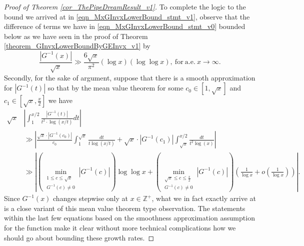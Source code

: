 \documentclass[11pt,reqno,a4letter]{article}
\numberwithin{figure}{section}
\numberwithin{table}{section}
\theoremstyle{plain}
\numberwithin{theorem}{section}
\theoremstyle{definition}
\begin{document}
\begin{proof}[Proof of Theorem \ref{cor_ThePipeDreamResult_v1}]
To complete the logic to the bound we arrived at in \eqref{eqn_MxGInvxLowerBound_stmt_v1}, 
observe that the difference of terms we have in 
\eqref{eqn_MxGInvxLowerBound_stmt_v0} bounded below as we have seen in the proof of 
Theorem \ref{theorem_GInvxLowerBoundByGEInvx_v1} by 
\[
\frac{|G^{-1}(x)|}{\sqrt{x}} \gg \frac{6\sqrt{x}}{\pi^2} (\log x) (\log\log x), 
     \mathrm{\ for\ a.e.\ } x \rightarrow \infty. 
\]
Secondly, for the sake of argument, 
suppose that there is a smooth approximation for $|G^{-1}(t)|$ so that by the 
mean value theorem for 
some $c_0 \in [1, \sqrt{x}]$ and $c_1 \in \left[\sqrt{x}, \frac{x}{2}\right]$ we have 
\begin{align*} 
\sqrt{x} & \left\lvert \int_1^{x/2} \frac{|G^{-1}(t)|}{t^2 \cdot \log(x/t)} dt \right\rvert \\ 
     & \gg \left\lvert \frac{\sqrt{x} \cdot |G^{-1}(c_0)|}{c_0} \int_1^{\sqrt{x}} \frac{dt}{t \log(x/t)} + 
     \sqrt{x} \cdot |G^{-1}(c_1)| \int_{\sqrt{x}}^{x/2} \frac{dt}{t^2 \log(x)} \right\rvert \\ 
     & \gg \left\lvert \left(\min\limits_{\substack{1 \leq c \leq \sqrt{x} \\ G^{-1}(c) \neq 0}} 
     |G^{-1}(c)|\right) \log\log x + 
     \left(\min\limits_{\substack{\sqrt{x} \leq c \leq \frac{x}{2} \\ G^{-1}(c) \neq 0}} 
     |G^{-1}(c)|\right) \left(\frac{1}{\log x} + o\left(\frac{1}{\log x}\right)\right) 
     \right\rvert. 
\end{align*} 
Since $G^{-1}(x)$ changes stepwise 
only at $x \in \mathbb{Z}^{+}$, what we in fact exactly arrive at 
is a close variant of this mean value theorem type observation. The statements within the 
last few equations based on the smoothness approximation assumption for the function make it 
clear without more technical complications how we should go about bounding these growth rates. 


\end{proof}
\end{document}
